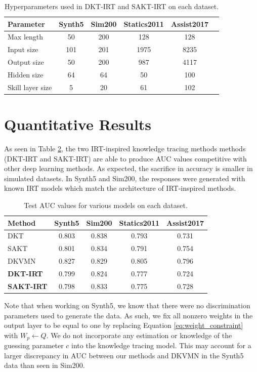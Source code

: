 \begin{table}
  \centering
  \begin{tabular}{l c c c c c}
    \hline
    Parameter & Synth5 & Sim200 & Statics2011 & Assist2017 \\
    \hline
    Max length & 50 & 200 & 128 & 128 \\
    Input size & 101 & 201 & 1975 & 8235 \\
    Output size & 50 & 200 & 987 & 4117 \\
    Hidden size & 64 & 64 & 50 & 100 \\
    Skill layer size & 5 & 20 & 61 & 102 
  \end{tabular}
  \caption{Hyperparameters used in DKT-IRT and SAKT-IRT on each dataset.}
  \label{tab:kt_params}
\end{table}

\section{Quantitative Results} \label{sec:kt_results}

As seen in Table \ref{tab:kt_results}, the two IRT-inspired knowledge tracing methods methods (DKT-IRT and SAKT-IRT) are able to produce AUC values competitive with other deep learning methods. As expected, the sacrifice in accuracy is smaller in simulated datasets. In Synth5 and Sim200, the responses were generated with known IRT models which match the architecture of IRT-inspired methods. 

\begin{table}
  \centering
  \begin{tabular}{l c c c c}
    \hline
    Method & Synth5 & Sim200 & Statics2011 & Assist2017 \\
    \hline 
    DKT & 0.803 & 0.838 & 0.793 & 0.731 \\
    SAKT & 0.801 & 0.834 & 0.791  & 0.754 \\
    DKVMN & 0.827 & 0.829 & 0.805 & 0.796 \\
    \textbf{DKT-IRT} & 0.799 & 0.824 & 0.777 & 0.724 \\
    \textbf{SAKT-IRT} & 0.798 & 0.833 & 0.775 & 0.728
  \end{tabular}
  \caption{Test AUC values for various models on each dataset.}
  \label{tab:kt_results}
\end{table}

Note that when working on Synth5, we know that there were no discrimination parameters used to generate the data. As such, we fix all nonzero weights in the output layer to be equal to one by replacing Equation \ref{eq:weight_constraint} with $W_p \gets Q$. We do not incorporate any estimation or knowledge of the guessing parameter $c$ into the knowledge tracing model. This may account for a larger discrepancy in AUC between our methods and DKVMN in the Synth5 data than seen in Sim200.

